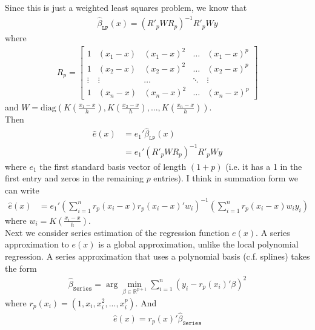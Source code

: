 \documentclass[12pt]{article}
\newcommand{\R}{\mathbb{R}}
\newcommand{\mtx}[1]{\ensuremath{\bm{\mathit{#1}}}}
\begin{document}
Since this is just a weighted least squares problem, we know that
\begin{align*}
\hat{\mtx{\beta}}_{\texttt{LP}}(x)  = (\mtx{R}'_p \mtx{W} \mtx{R}_p)^{-1}\mtx{R}'_p \mtx{W} \mtx{y}
\end{align*}
where
\begin{align*}
\mtx{R}_p = 
\begin{bmatrix}
1 & (x_1 - x) & (x_1-x)^2 & \dots& (x_1-x)^p \\
1 & (x_2 - x) & (x_2-x)^2 & \dots &(x_2-x)^p\\
\vdots & \vdots & \dots & \ddots & \vdots \\
1 & (x_n - x) & (x_n-x)^2 & \dots &(x_n-x)^p
\end{bmatrix}
\end{align*}
and $\mtx{W} = \text{diag}\left(K\left(\frac{x_1 - x}{h}\right), K\left(\frac{x_2 - x}{h}\right),..., K\left(\frac{x_n - x}{h}\right) \right)$.\\

Then
\begin{align*}
\hat{\mtx{e}}(x) &= \mtx{e}_1'\hat{\mtx{\beta}}_{\texttt{LP}}(x)  \\
&=\mtx{e}_1'(\mtx{R}'_p \mtx{W} \mtx{R}_p)^{-1}\mtx{R}'_p \mtx{W} \mtx{y}
\end{align*}
where $ \mtx{e}_1$ the first standard basis vector of length $(1+p)$ (i.e. it has a 1 in the first entry and zeros in the remaining $p$ entries). I think in summation form we can write
\begin{align*}
\hat{\mtx{e}}(x) &= \mtx{e}_1' (\sum_{i=1}^n \mtx{r}_p(x_i-x)\mtx{r}_p(x_i-x)' w_i)^{-1}(\sum_{i=1}^n \mtx{r}_p(x_i-x)w_iy_i)
\end{align*}
where $w_i = K\left(\frac{x_i - x}{h}\right)$.\\

Next we consider series estimation of the regression function $e(x)$. A series approximation to $e(x)$ is a global approximation, unlike the local polynomial regression. A series approximation that uses a polynomial basis (c.f. splines) takes the form
\begin{align*}
\hat{\mtx{\beta}}_{\texttt{Series}} = \arg \min_{\beta \in \R^{p+1}} \sum_{i=1}^n (y_i - \mtx{r}_p(x_i)' \mtx{\beta})^2
\end{align*}
where $\mtx{r}_p(x_i) = (1, x_i, x_i^2, ..., x_i^p)$. And
\begin{align*}
\hat e(x) =  \mtx{r}_p(x)'\hat{\mtx{\beta}}_{\texttt{Series}} 
\end{align*} 
\end{document}
